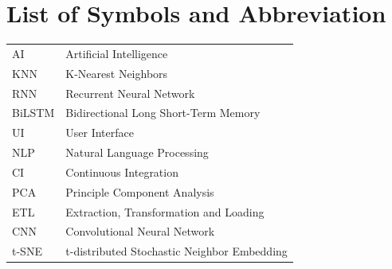 		\break


	    \tableofcontents

		\listoftables
		\break
		\pagebreak

		\listoffigures
		\break
	
	
	
		\Large
			\begingroup
				\let\clearpage\relax
				\chapter*{List of Symbols and Abbreviation}
			\endgroup
   
		\normalsize
		\begin{tabular}{p{1in}p{5in}} 
                AI & Artificial Intelligence\\
                KNN & K-Nearest Neighbors\\
                RNN & Recurrent Neural Network\\
                BiLSTM & Bidirectional Long Short-Term Memory\\
                UI & User Interface\\
                NLP & Natural Language Processing\\
                CI & Continuous Integration\\
                PCA & Principle Component Analysis\\
                ETL & Extraction, Transformation and Loading \\
                CNN & Convolutional Neural Network \\
                t-SNE & t-distributed Stochastic Neighbor Embedding \\
                
            \end{tabular}





		\break
		\pagebreak
		
	